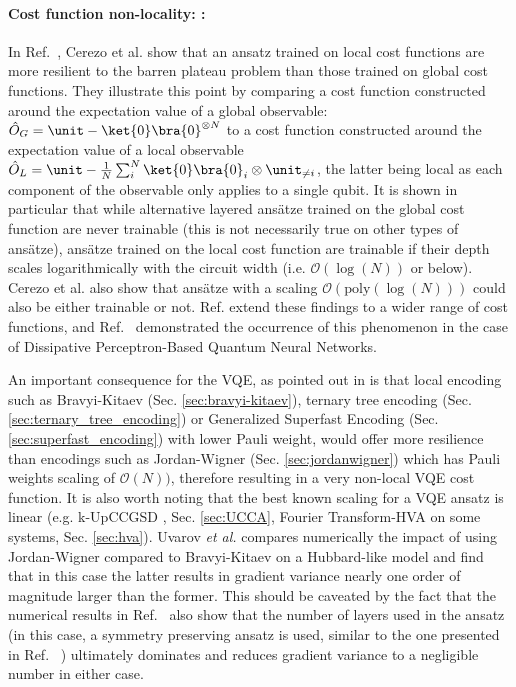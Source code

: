 \paragraph{Cost function non-locality: \cite{Cerezo2021_BP, Uvarov2020, Sharma2020}:} In Ref.~\cite{Cerezo2021_BP}, Cerezo et al. show that an ansatz trained on local cost functions are more resilient to the barren plateau problem than those trained on global cost functions. They illustrate this point by comparing a cost function constructed around the expectation value of a global observable: $\hat{O}_G = \unit - \ket{0}\bra{0}^{\otimes N}$ to a cost function constructed around the expectation value of a local observable $\hat{O}_L = \unit - \frac{1}{N} \sum_i^N \ket{0}\bra{0}_i \otimes \unit_{\neq i}$, the latter being local as each component of the observable only applies to a single qubit. It is shown in particular that while alternative layered ans{\"{a}}tze trained on the global cost function are never trainable (this is not necessarily true on other types of  ans{\"{a}}tze), ans{\"{a}}tze trained on the local cost function are trainable if their depth scales logarithmically with the circuit width (i.e. $\mathcal{O}(\log(N))$ or below). Cerezo et al. \cite{Cerezo2021_BP} also show that ans{\"{a}}tze with a scaling  $\mathcal{O}(\mathrm{poly}(\log(N)))$ could also be either trainable or not. Ref. \cite{Uvarov2020} extend these findings to a wider range of cost functions, and Ref.~\cite{Sharma2020} demonstrated the occurrence of this phenomenon in the case of Dissipative Perceptron-Based Quantum Neural Networks. 

An important consequence for the VQE, as pointed out in \cite{Cerezo2021_BP} is that local encoding such as Bravyi-Kitaev \cite{Bravyi2002, Seeley2012, Tranter2015} (Sec. \ref{sec:bravyi-kitaev}), ternary tree encoding \cite{Jiang2020} (Sec. \ref{sec:ternary_tree_encoding}) or Generalized Superfast Encoding \cite{Setia2019} (Sec. \ref{sec:superfast_encoding}) with lower Pauli weight, would offer more resilience than encodings such as Jordan-Wigner \cite{Jordan1928} (Sec. \ref{sec:jordanwigner}) which has Pauli weights scaling of $\mathcal{O}(N))$, therefore resulting in a very non-local VQE cost function. It is also worth noting that the best known scaling for a VQE ansatz is linear (e.g. k-UpCCGSD \cite{Lee2019}, Sec. \ref{sec:UCCA}, Fourier Transform-HVA \cite{Babbush2018} on some systems, Sec. \ref{sec:hva}). Uvarov \textit{et al.} \cite{Uvarov2020_frustrated} compares numerically the impact of using Jordan-Wigner compared to Bravyi-Kitaev on a Hubbard-like model and find that in this case the latter results in gradient variance nearly one order of magnitude larger than the former. This should be caveated by the fact that the numerical results in Ref.~\cite{Uvarov2020_frustrated} also show that the number of layers used in the ansatz (in this case, a symmetry preserving ansatz is used, similar to the one presented in Ref.~ \cite{Barkoutsos2018}) ultimately dominates and reduces gradient variance to a negligible number in either case.

